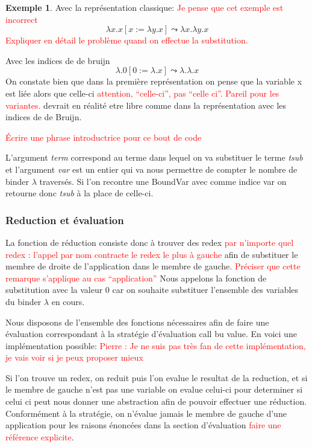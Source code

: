 \documentclass {article}
\newcommand{\codefrom}[3]
           {}
\theoremstyle{definition}
\newtheorem{example}{Exemple}
\theoremstyle{remark}
\newcommand{\todo}[1]{\textcolor{red}{#1}}
\begin{document}
\begin{example}
  Avec la représentation classique: \todo{Je pense que cet exemple est incorrect}
  \[ 
  \lambda x.x[x := \lambda y.x]\leadsto\lambda x.\lambda y.x
  \]
  \todo{Expliquer en détail le problème quand on effectue la substitution.}

  Avec les indices de de bruijn
  \[ 
  \lambda.0[0 := \lambda.x]\leadsto\lambda.\lambda.x
  \]
  On constate bien que dans la première représentation on pense que la variable
  x est liée alors que celle-ci \todo{attention, ``celle-ci'', pas ``celle ci''. Pareil pour les variantes.} devrait en réalité etre libre comme dans la 
  représentation avec les indices de de Bruijn.
\end{example}

\todo{Écrire une phrase introductrice pour ce bout de code}

\codefrom{untyped}{lambda}{substitution}

L'argument \emph{term} correspond au terme dans lequel on va substituer le terme \emph{tsub} et 
l'argument \emph{var} est un entier qui va nous permettre de compter le nombre de binder \(\lambda\)
traversés. Si l'on recontre une BoundVar avec comme indice var on retourne donc \emph{tsub} à la 
place de celle-ci.


\subsubsection{Reduction et évaluation}
La fonction de réduction consiste donc à trouver des redex \todo{par
  n'importe quel redex : l'appel par nom contracte le redex le plus à
  gauche} afin de substituer le membre de droite de l'application dans
le membre de gauche. \todo{Préciser que cette remarque s'applique au cas ``application''} Nous appelons la fonction de substitution  avec la
valeur \(0\) car on souhaite substituer l'ensemble des variables du binder
\(\lambda\) en cours.

\codefrom{untyped}{lambda}{reduction}

Nous disposons de l'ensemble des fonctions nécessaires afin de faire une évaluation 
correspondant à la stratégie d'évaluation call bu value. En voici une implémentation
possible: 
\todo{Pierre : Je ne suis pas très fan de cette implémentation, je vais voir si je peux proposer mieux}

\codefrom{untyped}{lambda}{evaluation}

Si l'on trouve un redex, on reduit puis l'on evalue le resultat de la reduction,
et si le membre de gauche n'est pas une variable on evalue celui-ci pour determiner
si celui ci peut nous donner une abstraction afin de pouvoir effectuer une réduction.
Conformément à la stratégie, on n'évalue jamais le membre de gauche d'une application
pour les raisons énoncées dans la section d'évaluation \todo{faire une référence explicite}.
\end{document}
